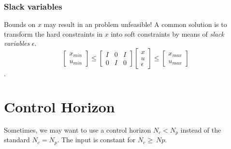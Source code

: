 \documentclass[a4paper,12pt,fleqn]{book}
\newcommand{\Np}{{N_p}}
\newcommand{\Nc}{{N_c}}
\newcommand{\slack}{\epsilon}
\begin{document}
\subsubsection{Slack variables}
Bounds on $x$ may result in an problem unfeasible! A common solution
is to transform the hard constraints in $x$ into soft constraints by means of  \emph{slack variables} $\slack$.
\begin{equation}
\begin{bmatrix}
 x_{min}\\u_{min}
\end{bmatrix}
\leq
\begin{bmatrix}
 I &0 &I\\
 0 &I & 0
\end{bmatrix}
\begin{bmatrix}
 x\\
 u\\
 \slack
\end{bmatrix}
\leq
\begin{bmatrix}
 x_{max}\\u_{max}
\end{bmatrix}
\end{equation}.

\section{Control Horizon}
Sometimes, we may want to use a control horizon $\Nc < \Np$ instead of the standard $\Nc = \Np$. The input is constant for $\Nc \geq \ Np$.
\end{document}
